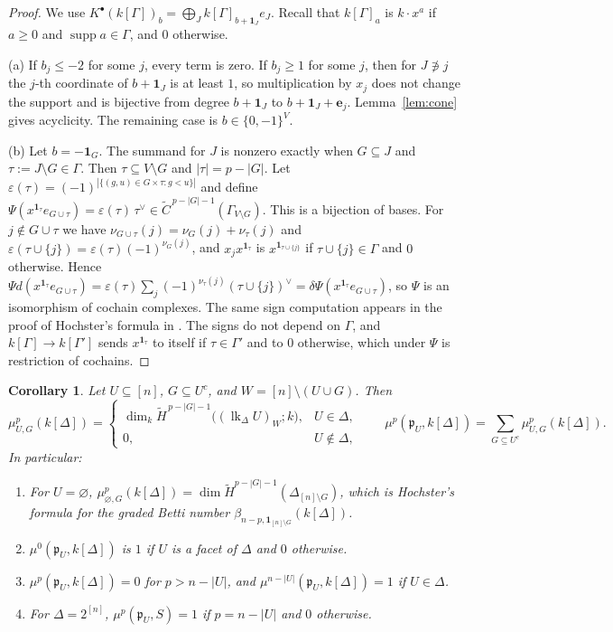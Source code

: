 \documentclass[11pt]{article}
\theoremstyle{plain}
\newtheorem{corollary}[theorem]{Corollary}
\theoremstyle{definition}
\newcommand{\kk}{k}
\newcommand{\pp}{\mathfrak{p}}
\newcommand{\link}{\operatorname{lk}}
\newcommand{\rH}{\widetilde{H}}
\newcommand{\rC}{\widetilde{C}}
\newcommand{\one}{\mathbf 1}
\newcommand{\supp}{\operatorname{supp}}
\begin{document}
\begin{proof}
We use $K^\bullet(\kk[\Gamma])_b=\bigoplus_J\kk[\Gamma]_{b+\one_J}e_J$. Recall that $\kk[\Gamma]_a$ is
$\kk\cdot x^a$ if $a\ge0$ and $\supp a\in\Gamma$, and $0$ otherwise.

(a) If $b_j\le-2$ for some $j$, every term is zero. If $b_j\ge1$ for some $j$, then for $J\not\ni j$ the
$j$-th coordinate of $b+\one_J$ is at least $1$, so multiplication by $x_j$ does not change the support and
is bijective from degree $b+\one_J$ to $b+\one_J+\mathbf e_j$. Lemma~\ref{lem:cone} gives acyclicity. The
remaining case is $b\in\{0,-1\}^V$.

(b) Let $b=-\one_G$. The summand for $J$ is nonzero exactly when $G\subseteq J$ and $\tau:=J\setminus G\in\Gamma$.
Then $\tau\subseteq V\setminus G$ and $|\tau|=p-|G|$. Let $\varepsilon(\tau)=(-1)^{|\{(g,u)\in G\times\tau:g<u\}|}$
and define $\Psi(x^{\one_\tau}e_{G\cup\tau})=\varepsilon(\tau)\,\tau^\vee\in\rC^{\,p-|G|-1}(\Gamma_{V\setminus G})$.
This is a bijection of bases. For $j\notin G\cup\tau$ we have $\nu_{G\cup\tau}(j)=\nu_G(j)+\nu_\tau(j)$ and
$\varepsilon(\tau\cup\{j\})=\varepsilon(\tau)(-1)^{\nu_G(j)}$, and $x_jx^{\one_\tau}$ is $x^{\one_{\tau\cup\{j\}}}$
if $\tau\cup\{j\}\in\Gamma$ and $0$ otherwise. Hence
$\Psi d(x^{\one_\tau}e_{G\cup\tau})=\varepsilon(\tau)\sum_j(-1)^{\nu_\tau(j)}(\tau\cup\{j\})^\vee=\delta\Psi(x^{\one_\tau}e_{G\cup\tau})$,
so $\Psi$ is an isomorphism of cochain complexes. The same sign computation appears in the proof of Hochster's
formula in \cite{HeSuwayyidWei}. The signs do not depend on $\Gamma$, and $\kk[\Gamma]\to\kk[\Gamma']$ sends
$x^{\one_\tau}$ to itself if $\tau\in\Gamma'$ and to $0$ otherwise, which under $\Psi$ is restriction of cochains.
\end{proof}

\begin{corollary}\label{cor:bass-static}
Let $U\subseteq[n]$, $G\subseteq U^c$, and $W=[n]\setminus(U\cup G)$. Then
\[
\mu^p_{U,G}(\kk[\Delta])=
\begin{cases}\dim_\kk\rH^{\,p-|G|-1}\bigl((\link_\Delta U)_W;\kk\bigr),&U\in\Delta,\\ 0,&U\notin\Delta,\end{cases}
\qquad
\mu^p(\pp_U,\kk[\Delta])=\sum_{G\subseteq U^c}\mu^p_{U,G}(\kk[\Delta]).
\]
In particular:
\begin{enumerate}[label=\textup{(\roman*)},nosep]
\item For $U=\varnothing$, $\mu^p_{\varnothing,G}(\kk[\Delta])=\dim\rH^{p-|G|-1}(\Delta_{[n]\setminus G})$, which is
Hochster's formula for the graded Betti number $\beta_{n-p,\one_{[n]\setminus G}}(\kk[\Delta])$.
\item $\mu^0(\pp_U,\kk[\Delta])$ is $1$ if $U$ is a facet of $\Delta$ and $0$ otherwise.
\item $\mu^p(\pp_U,\kk[\Delta])=0$ for $p>n-|U|$, and $\mu^{n-|U|}(\pp_U,\kk[\Delta])=1$ if $U\in\Delta$.
\item For $\Delta=2^{[n]}$, $\mu^p(\pp_U,S)=1$ if $p=n-|U|$ and $0$ otherwise.
\end{enumerate}
\end{corollary}
\end{document}
